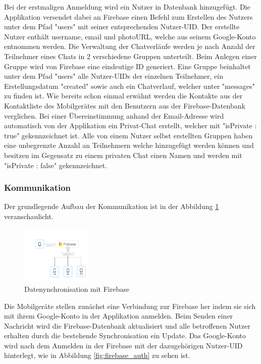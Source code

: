 Bei der erstmaligen Anmeldung wird ein Nutzer in Datenbank hinzugefügt. Die Applikation versendet dabei an Firebase einen Befehl zum Erstellen des Nutzers unter dem Pfad "users" mit seiner entsprechenden Nutzer-UID. Der erstellte Nutzer enthält username, email und photoURL, welche aus seinem Google-Konto entnommen werden.
Die Verwaltung der Chatverläufe werden je nach Anzahl der Teilnehmer eines Chats in 2 verschiedene Gruppen unterteilt. Beim Anlegen einer Gruppe wird von Firebase eine eindeutige ID generiert. Eine Gruppe beinhaltet unter dem Pfad "users" alle Nutzer-UIDs der einzelnen Teilnehmer, ein Erstellungsdatum "created" sowie auch ein Chatverlauf, welcher unter "messages" zu finden ist.  Wie bereits schon einmal erwähnt werden die Kontakte aus der Kontaktliste des Mobilgerätes mit den Benutzern aus der Firebase-Datenbank verglichen. Bei einer Übereinstimmung anhand der Email-Adresse wird automatisch von der Applikation ein Privat-Chat erstellt, welcher mit "isPrivate : true" gekennzeichnet ist. Alle von einem Nutzer selbst erstellten Gruppen haben eine unbegrenzte Anzahl an Teilnehmern welche hinzugefügt werden können und besitzen im Gegensatz zu einem privaten Chat einen Namen und werden mit "isPrivate : false" gekennzeichnet.

\subsubsection{Kommunikation}

Der grundlegende Aufbau der Kommunikation ist in der Abbildung \ref{fig:firebase_sync} veranschaulicht.

\begin{figure}[ht]
  \centering
    \includegraphics[width=0.3\textwidth]{images/firebase_sync}
    \caption{Datenynchronisation mit Firebase}
	 \label{fig:firebase_sync}
\end{figure}

Die Mobilgeräte stellen zunächst eine Verbindung zur Firebase her indem sie sich mit ihrem Google-Konto in der Applikation anmelden. Beim Senden einer Nachricht wird die Firebase-Datenbank aktualisiert und alle betroffenen Nutzer erhalten durch die bestehende Synchronisation ein Update. 
Das Google-Konto wird nach dem Anmelden in der Firebase mit der dazugehörigen Nutzer-UID hinterlegt, wie in Abbildung \ref{fig:firebase_auth} zu sehen ist.

